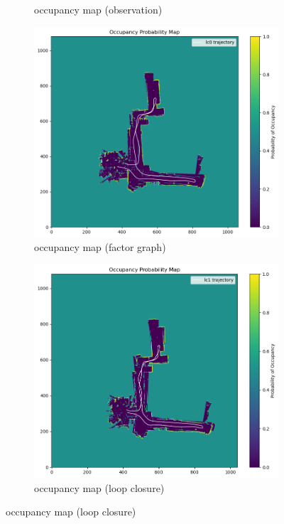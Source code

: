 \documentclass[conference]{IEEEtran}
\begin{document}
\begin{figure}[htbp]
\begin{subfigure}{0.24\textwidth}
        \caption{occupancy map (observation)}
        \label{fig:omap_20_icp}
    \end{subfigure}
    \hfill
    \begin{subfigure}{0.24\textwidth}
        \includegraphics[width=\linewidth]{../img/omap_20_lc0.png}
        \caption{occupancy map (factor graph)}
        \label{fig:omap_20_lc0}
    \end{subfigure}
    \hfill
    \begin{subfigure}{0.24\textwidth}
        \includegraphics[width=\linewidth]{../img/omap_20_lc1.png}
        \caption{occupancy map (loop closure)}
        \label{fig:omap_20_lc1}
    \end{subfigure}
    

\end{figure}
\end{document}
